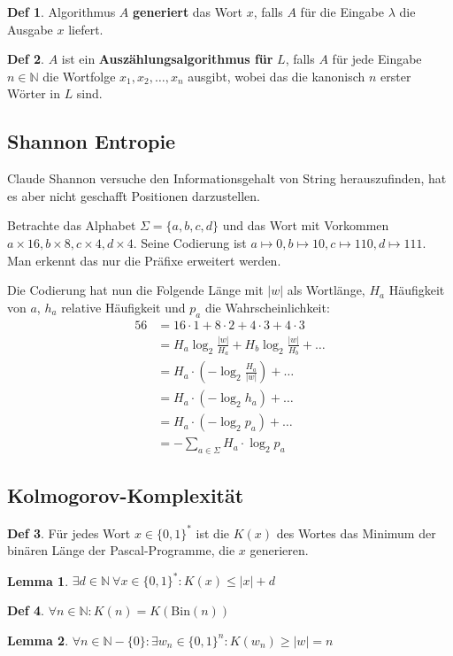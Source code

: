\documentclass[a4paper, 10pt]{article}
\theoremstyle{definition}
\newtheorem{definition}{Def}[section]
\newtheorem{lemma}{Lemma}[section]
\newcommand{\N}{\mathbb{N}}
\newcommand{\A}{\Sigma}
\begin{document}
\begin{definition}
    Algorithmus \(A\) \textbf{generiert} das Wort \(x\), falls \(A\) für die Eingabe \(\lambda\) die Ausgabe \(x\) liefert.
\end{definition}

\begin{definition}
    \(A\) ist ein \textbf{Auszählungsalgorithmus für} \(L\), falls \(A\) für jede Eingabe \(n \in \N\) die Wortfolge \(x_1, x_2, \ldots, x_n\) ausgibt, wobei das die kanonisch \(n\) erster Wörter in \(L\) sind.
\end{definition}

\subsection*{Shannon Entropie}
Claude Shannon versuche den Informationsgehalt von String herauszufinden, hat es aber nicht geschafft Positionen darzustellen.

Betrachte das Alphabet \(\A = \{a, b, c, d\}\) und das Wort mit Vorkommen \(a \times 16, b \times 8, c \times 4, d \times 4\). Seine Codierung ist \(a \mapsto 0, b \mapsto 10, c \mapsto 110, d \mapsto 111\). Man erkennt das nur die Präfixe erweitert werden.

Die Codierung hat nun die Folgende Länge mit \(|w|\) als Wortlänge, \(H_a\) Häufigkeit von \(a\), \(h_a\) relative Häufigkeit und \(p_a\) die Wahrscheinlichkeit:
\begin{align*}
    56 &= 16 \cdot 1 + 8 \cdot 2 + 4 \cdot 3 + 4 \cdot 3 \\
    &= H_a \log_2\frac{|w|}{H_a} +  H_b \log_2\frac{|w|}{H_b} + \ldots \\
    &= H_a \cdot (- \log_2 \frac{H_a}{|w|}) + \ldots \\
    &= H_a \cdot (- \log_2 h_a) + \ldots \\
    &= H_a \cdot (- \log_2 p_a) + \ldots \\
    &= - \sum_{a \in \A} H_a \cdot \log_2 p_a
\end{align*}

\subsection*{Kolmogorov-Komplexität}
\begin{definition}
    Für jedes Wort \(x \in \{0, 1\}^*\) ist die \(K(x)\) des Wortes das Minimum der binären Länge der Pascal-Programme, die \(x\) generieren.
\end{definition}

\begin{lemma}
    \(\exists d \in \N \ \forall x \in \{0, 1\}^* : K(x) \leq |x| + d\)
\end{lemma}

\begin{definition}
    \(\forall n \in \N: K(n) = K(\text{Bin}(n))\)
\end{definition}

\begin{lemma}
    \(\forall n \in \N - \{0\}: \exists w_n \in \{0, 1\}^n: K(w_n) \geq |w| = n\)
\end{lemma}
\end{document}

